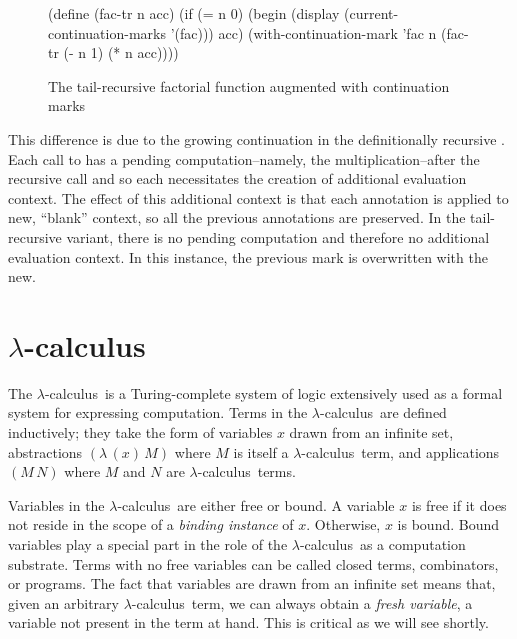 \documentclass[ms,electronic,twosidetoc,letterpaper,chaptercenter,parttop]{byumsphd}
\newcommand{\lc}{$\lambda$-calculus}
\newcommand{\abs}[2]{(\lambda\,(#1)\,#2)}
\newcommand{\app}[2]{(#1\,#2)}
\begin{document}
\begin{figure}
\begin{schemedisplay}
(define (fac-tr n acc)
  (if (= n 0)
      (begin
        (display (current-continuation-marks '(fac)))
        acc)
      (with-continuation-mark 'fac n (fac-tr (- n 1) (* n acc))))
\end{schemedisplay}
\caption{The tail-recursive factorial function augmented with continuation marks}
\label{fac-tail-rec-cm}
\end{figure}

This difference is due to the growing continuation in the definitionally recursive
. Each call to  has a pending computation--namely, the
multiplication--after the recursive call and so each necessitates the creation of
additional evaluation context. The effect of this additional context is that each
annotation is applied to new, ``blank'' context, so all the previous annotations are
preserved. In the tail-recursive variant, there is no pending computation and therefore no
additional evaluation context. In this instance, the previous mark is overwritten with the
new.

\chapter{\lc}

The \lc\ is a Turing-complete system of logic extensively used as a formal system for
expressing computation. Terms in the \lc\ are defined inductively; they take the form of
variables $x$ drawn from an infinite set, abstractions $\abs{x}{M}$ where $M$ is itself a
\lc\ term, and applications $\app{M}{N}$ where $M$ and $N$ are \lc\ terms.

Variables in the \lc\ are either free or bound. A variable $x$ is free if it does not
reside in the scope of a \emph{binding instance} of $x$. Otherwise, $x$ is bound. Bound
variables play a special part in the role of the \lc\ as a computation substrate. Terms
with no free variables can be called closed terms, combinators, or programs. The fact that
variables are drawn from an infinite set means that, given an arbitrary \lc\ term, we can
always obtain a \emph{fresh variable}, a variable not present in the term at hand. This is
critical as we will see shortly.
\end{document}

